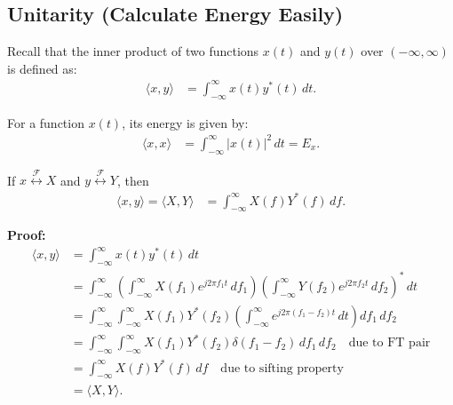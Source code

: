 \subsection{Unitarity (Calculate Energy Easily)}

\begin{definition}
    Recall that the inner product of two functions \( x(t) \) and \( y(t) \) over \( (-\infty, \infty) \) is defined as:
    \begin{align*}
    \langle x, y \rangle &= \int_{-\infty}^{\infty} x(t) y^*(t) \, dt.
    \end{align*}

    For a function \( x(t) \), its energy is given by:
    \begin{align*}
    \langle x, x \rangle &= \int_{-\infty}^{\infty} |x(t)|^2 \, dt = E_x.
    \end{align*}
\end{definition}

\begin{definition}
    If \( x \overset{\mathcal{F}}{\leftrightarrow} X \) and \( y \overset{\mathcal{F}}{\leftrightarrow} Y \), then 
    \begin{align*}
        \langle x, y \rangle = \langle X, Y \rangle &= \int_{-\infty}^{\infty} X(f) Y^*(f) \, df.
    \end{align*}
\end{definition}

\begin{derivation}
    \textbf{Proof:}
    \begin{align*}
    \langle x, y \rangle &= \int_{-\infty}^{\infty} x(t) y^*(t) \, dt \\
    &= \int_{-\infty}^{\infty} \left( \int_{-\infty}^{\infty} X(f_1) e^{j 2 \pi f_1 t} \, df_1 \right) \left( \int_{-\infty}^{\infty} Y(f_2) e^{j 2 \pi f_2 t} \, df_2 \right)^* \, dt \\
    &= \int_{-\infty}^{\infty} \int_{-\infty}^{\infty} X(f_1) Y^*(f_2) \left( \int_{-\infty}^{\infty} e^{j 2 \pi (f_1 - f_2) t} \, dt \right) df_1 \, df_2 \\
    &= \int_{-\infty}^{\infty} \int_{-\infty}^{\infty} X(f_1) Y^*(f_2) \delta(f_1 - f_2) \, df_1 \, df_2 \quad \text{due to FT pair}\\
    &= \int_{-\infty}^{\infty} X(f) Y^*(f) \, df \quad \text{due to sifting property}\\
    &= \langle X, Y \rangle.
    \end{align*}
\end{derivation}

